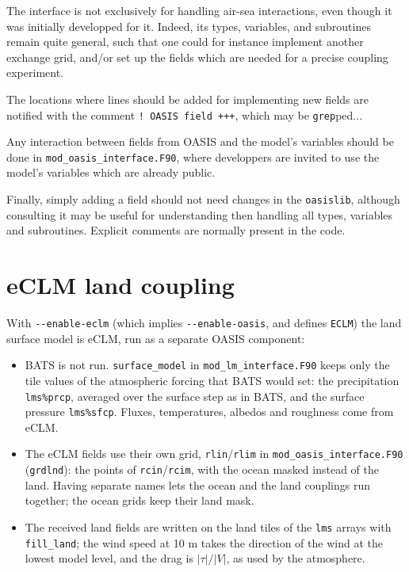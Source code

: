 The interface is not exclusively for handling air-sea interactions, even though
it was
initially developped for it. Indeed, its types, variables, and subroutines
remain quite
general, such that one could for instance implement another exchange grid,
and/or set up
the fields which are needed for a precise coupling experiment.

The locations where lines should be added for implementing new fields are
notified with
the comment \verb=! OASIS field +++=, which may be \verb=grep=ped...

Any interaction between fields from OASIS and the model's variables should be
done in
\verb=mod_oasis_interface.F90=, where developpers are invited to use the model's
variables
which are already public.

Finally, simply adding a field should not need changes in the \verb=oasislib=,
although
consulting it may be useful for understanding then handling all types, variables
and
subroutines. Explicit comments are normally present in the code.

\section{eCLM land coupling}

With \verb=--enable-eclm= (which implies \verb=--enable-oasis=, and defines
\verb=ECLM=) the land surface model is eCLM, run as a separate OASIS
component:
\begin{itemize}
  \item BATS is not run. \verb=surface_model= in \verb=mod_lm_interface.F90=
        keeps only the tile values of the atmospheric forcing that BATS
        would set: the precipitation \verb=lms%prcp=, averaged over the
        surface step as in BATS, and the surface pressure \verb=lms%sfcp=.
        Fluxes, temperatures, albedos and roughness come from eCLM.
  \item The eCLM fields use their own grid, \verb=rlin=/\verb=rlim= in
        \verb=mod_oasis_interface.F90= (\verb=grdlnd=): the points of
        \verb=rcin=/\verb=rcim=, with the ocean masked instead of the land.
        Having separate names lets the ocean and the land couplings run
        together; the ocean grids keep their land mask.
  \item The received land fields are written on the land tiles of the
        \verb=lms= arrays with \verb=fill_land=; the wind speed at 10 m
        takes the direction of the wind at the lowest model level, and
        the drag is $|\tau|/|V|$, as used by the atmosphere.
\end{itemize}

